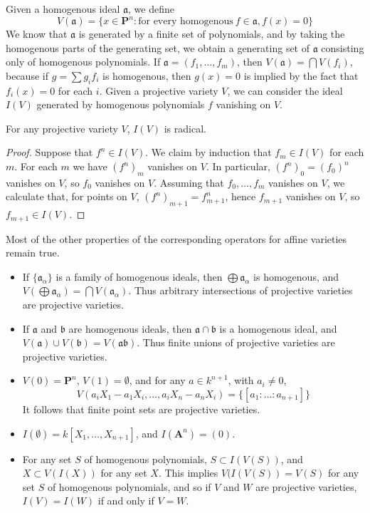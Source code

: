 Given a homogenous ideal $\mathfrak{a}$, we define
%
\[ V(\mathfrak{a}) = \{ x \in \mathbf{P}^n: \text{for every homogenous}\ f \in \mathfrak{a}, f(x) = 0 \} \]
%
We know that $\mathfrak{a}$ is generated by a finite set of polynomials, and by taking the homogenous parts of the generating set, we obtain a generating set of $\mathfrak{a}$ consisting only of homogenous polynomials. If $\mathfrak{a} = (f_1, \dots, f_m)$, then $V(\mathfrak{a}) = \bigcap V(f_i)$, because if $g = \sum g_i f_i$ is homogenous, then $g(x) = 0$ is implied by the fact that $f_i(x) = 0$ for each $i$. Given a projective variety $V$, we can consider the ideal $I(V)$ generated by homogenous polynomials $f$ vanishing on $V$.

\begin{theorem}
    For any projective variety $V$, $I(V)$ is radical.
\end{theorem}
\begin{proof}
    Suppose that $f^n \in I(V)$. We claim by induction that $f_m \in I(V)$ for each $m$. For each $m$ we have $(f^n)_m$ vanishes on $V$. In particular, $(f^n)_0 = (f_0)^n$ vanishes on $V$, so $f_0$ vanishes on $V$. Assuming that $f_0, \dots, f_m$ vanishes on $V$, we calculate that, for points on $V$, $(f^n)_{m+1} = f_{m+1}^n$, hence $f_{m+1}$ vanishes on $V$, so $f_{m+1} \in I(V)$.
\end{proof}

Most of the other properties of the corresponding operators for affine varieties remain true.
%
\begin{itemize}
    \item If $\{ \mathfrak{a}_\alpha \}$ is a family of homogenous ideals, then $\bigoplus \mathfrak{a}_\alpha$ is homogenous, and $V(\bigoplus \mathfrak{a}_\alpha) = \bigcap V(\mathfrak{a}_\alpha)$. Thus arbitrary intersections of projective varieties are projective varieties.

    \item If $\mathfrak{a}$ and $\mathfrak{b}$ are homogenous ideals, then $\mathfrak{a} \cap \mathfrak{b}$ is a homogenous ideal, and $V(\mathfrak{a}) \cup V(\mathfrak{b}) = V(\mathfrak{a}\mathfrak{b})$. Thus finite unions of projective varieties are projective varieties.

    \item $V(0) = \mathbf{P}^n$, $V(1) = \emptyset$, and for any $a \in k^{n+1}$, with $a_i \neq 0$,
    \[ V(a_iX_1 - a_1X_i, \dots, a_iX_n - a_nX_i) = \{ [a_1:\dots:a_{n+1}] \} \]
    It follows that finite point sets are projective varieties.

    \item $I(\emptyset) = k[X_1, \dots, X_{n+1}]$, and $I(\mathbf{A}^n) = (0)$.

    \item For any set $S$ of homogenous polynomials, $S \subset I(V(S))$, and $X \subset V(I(X))$ for any set $X$. This implies $V(I(V(S)) = V(S)$ for any set $S$ of homogenous polynomials, and so if $V$ and $W$ are projective varieties, $I(V) = I(W)$ if and only if $V = W$.
\end{itemize}

